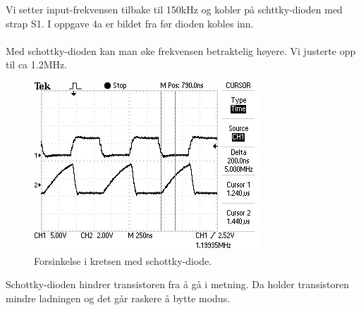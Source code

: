 Vi setter input-frekvensen tilbake til 150kHz og kobler på schttky-dioden med
strap S1.
I oppgave 4a er bildet fra før dioden kobles inn.
\\\\
Med schottky-dioden kan man øke frekvensen betraktelig høyere.
Vi justerte opp til ca 1.2MHz.
\begin{figure}[H]
  \caption{Forsinkelse i kretsen med schottky-diode.}
  \centering
    \includegraphics[width=\textwidth]{5.jpg}
\end{figure}
Schottky-dioden hindrer transistoren fra å gå i metning.
Da holder transistoren mindre ladningen og det går raskere å bytte modus.
